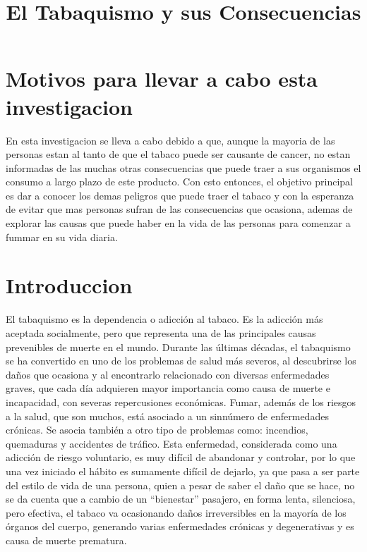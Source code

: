 \documentclass{bmcart}
\begin{document}
	
	\begin{frontmatter}
		
		
		\title{El Tabaquismo y sus Consecuencias}
		
		\author[
		]{ }
		
	\end{frontmatter}
	
	\section*{Motivos para llevar a cabo esta investigacion}
	En esta investigacion se lleva a cabo debido a que, aunque la mayoria de las personas estan al tanto de que el tabaco puede ser causante de cancer, no estan informadas de las muchas otras consecuencias que puede traer a sus organismos el consumo a largo plazo de este producto. Con esto entonces, el objetivo principal es dar a conocer los demas peligros que puede traer el tabaco y con la esperanza de evitar que mas personas sufran de las consecuencias que ocasiona, ademas de explorar las causas que puede haber en la vida de las personas para comenzar a fummar en su vida diaria. 
	
	\section*{Introduccion}
	El tabaquismo es la dependencia o adicción al tabaco. Es la adicción más aceptada socialmente, pero que representa una de las principales causas prevenibles de muerte en el mundo.
	Durante las últimas décadas, el tabaquismo se ha convertido en uno de los problemas de salud más severos, al descubrirse los daños que ocasiona y al encontrarlo relacionado con diversas enfermedades graves, que cada día adquieren mayor importancia como causa de muerte e incapacidad, con severas repercusiones económicas.
	Fumar, además de los riesgos a la salud, que son muchos, está asociado a un sinnúmero de enfermedades crónicas. Se asocia también a otro tipo de problemas como: incendios, quemaduras y accidentes de tráfico.
	Esta enfermedad, considerada como una adicción de riesgo voluntario, es muy difícil de abandonar y controlar, por lo que una vez iniciado el hábito es sumamente difícil de dejarlo, ya que pasa a ser parte del estilo de vida de una persona, quien a pesar de saber el daño que se hace, no se da cuenta que a cambio de un “bienestar” pasajero, en forma lenta, silenciosa, pero efectiva, el tabaco va ocasionando daños irreversibles en la mayoría de los órganos del cuerpo, generando varias enfermedades crónicas y degenerativas y es causa de muerte prematura.
	
\end{document}
